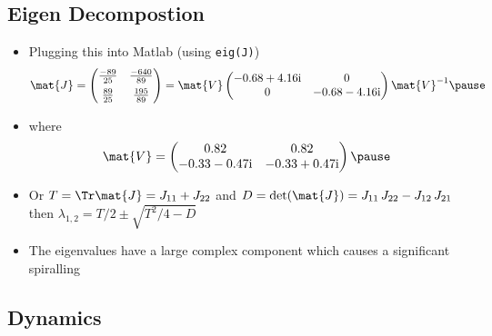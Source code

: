 \newcommand{\ii}{\mathrm{i}}

\begin{slide}
\section[-2]{Eigen Decompostion}

\begin{PauseHighLight}
  \begin{itemize}
  \item Plugging this into Matlab (using \texttt{eig(J)})
    {\small \begin{align*}
      \mat{J} =
      \begin{pmatrix}
        \frac{-89}{25} & \frac{-640}{89}\\
        \rule{0pt}{3ex} \frac{89}{25} & \frac{195}{89}
      \end{pmatrix}
      = \mat{V}
      \begin{pmatrix}
        -0.68 + 4.16\ii & 0 \\
        0  &  -0.68 - 4.16\ii
      \end{pmatrix}
      \mat{V}^{-1}\pause
    \end{align*}}
   \item where
     \begin{align*}
       \mat{V} = \begin{pmatrix}
        0.82 &   0.82 \\
        -0.33 - 0.47\ii  & -0.33 + 0.47\ii 
      \end{pmatrix} \pause                     
     \end{align*}
   \item Or $T = \Tr \mat{J} = J_{11} + J_{22}$ and $D=
     \det(\mat{J})=J_{11}\,J_{22}-J_{12}\,J_{21}$ then $\lambda_{1,2} =
     T/2 \pm \sqrt{T^{2}/4-D}$\pause
   \item The eigenvalues have a large complex component which causes a
     significant spiralling\pause
  \end{itemize}
\end{PauseHighLight}

\end{slide}


\begin{slide}
\section[-2]{Dynamics}

\pause
\pb {}
\begin{center}
  \pause
\end{center}
\end{slide}


